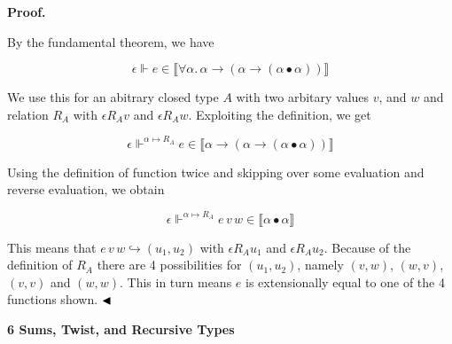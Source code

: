 
\par\medskip\noindent\textbf{Proof.}\par
 
 
By the fundamental theorem, we have\par
  
\par  \quad  \[\epsilon\Vdash e\in\llbracket\forall\alpha.\,\alpha\mathbin{\rightarrow}(\alpha\mathbin{\rightarrow}(\alpha\bullet\alpha))\rrbracket\]\quad  \quad  
  
We use this for an abitrary closed type $A$ with two arbitary values $v$, and $w$ and relation $R_{A}$ with $\epsilon\mathrel{R_{A}}v$ and $\epsilon\mathrel{R_{A}}w$. Exploiting the definition, we get\par
  
\par  \quad  \[\epsilon\Vdash^{\alpha\mapsto R_{A}}e\in\llbracket\alpha\mathbin{\rightarrow}(\alpha\mathbin{\rightarrow}(\alpha\bullet\alpha))\rrbracket\]\quad  \quad  
  
Using the definition of function twice and skipping over some evaluation and reverse evaluation, we obtain\par
  
\par  \quad  \[\epsilon\Vdash^{\alpha\mapsto R_{A}}e\,v\,w\in\llbracket\alpha\bullet\alpha\rrbracket\]\quad  \quad  
  
This means that $e\,v\,w\mathrel{\hookrightarrow}(u_{1},u_{2})$ with $\epsilon\mathrel{R_{A}}u_{1}$ and $\epsilon\mathrel{R_{A}}u_{2}$. Because of the definition of $R_{A}$ there are 4 possibilities for $(u_{1},u_{2})$, namely $(v,w)$, $(w,v)$, $(v,v)$ and $(w,w)$. This in turn means $e$ is extensionally equal to one of the 4 functions shown. $\hfill\blacktriangleleft$\par
 
 
 


 
\par\medskip\noindent\textbf{6 Sums, Twist, and Recursive Types}\par
 
 
